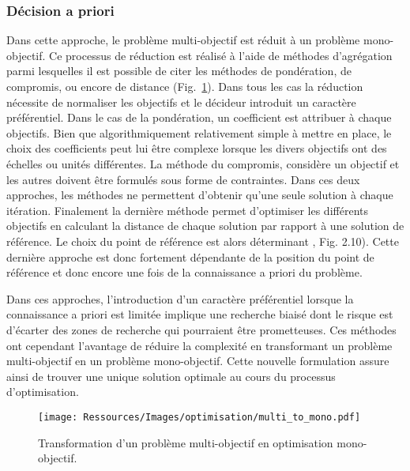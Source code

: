 \subsubsection{Décision a priori} %
\label{ssub:decision_a_priori}
Dans cette approche, le problème multi-objectif est réduit à un problème mono-objectif.
Ce processus de réduction est réalisé à l’aide de méthodes d’agrégation parmi lesquelles
il est possible de citer les méthodes de pondération, de compromis,
ou encore de distance (Fig.~\ref{fig:multi_to_mono}). Dans tous les cas la réduction
nécessite de normaliser les objectifs et le décideur introduit un caractère préférentiel.
Dans le cas de la pondération, un coefficient est attribuer à chaque objectifs. Bien que
algorithmiquement relativement simple à mettre en place, le choix des coefficients peut
lui être complexe lorsque les divers objectifs ont des échelles ou unités différentes.
La méthode du compromis, considère un objectif et les autres doivent être formulés
sous forme de contraintes.
Dans ces deux approches, les méthodes ne permettent d’obtenir qu’une seule
solution à chaque itération.
Finalement la dernière méthode permet d’optimiser les différents objectifs en calculant
la distance de chaque solution par rapport à une solution de référence. Le choix
du point de référence est alors déterminant \parencite{Collette2002}, Fig. 2.10).
Cette dernière approche est donc fortement dépendante de la position du point de
référence et donc encore une fois de la connaissance a priori du problème.

Dans ces approches, l’introduction d’un caractère préférentiel lorsque la connaissance a priori
est limitée implique une recherche biaisé dont le risque est d’écarter des zones
de recherche qui pourraient être prometteuses. Ces méthodes ont cependant l’avantage
de réduire la complexité en transformant un problème multi-objectif en un problème
mono-objectif. Cette nouvelle formulation assure ainsi de trouver une unique solution
optimale au cours du processus d’optimisation.

\begin{figure}
    \begin{center}
        \texttt{[image: Ressources/Images/optimisation/multi\_to\_mono.pdf]}
    \end{center}
    \caption{Transformation d’un problème multi-objectif en optimisation mono-objectif.
             \label{fig:multi_to_mono}}
\end{figure}


